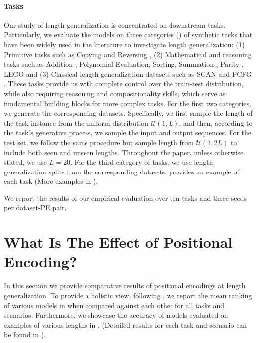 \documentclass{article}
\begin{document}
\paragraph{Tasks}
Our study of length generalization is concentrated on downstream tasks.
Particularly, we evaluate the models on three categories () of synthetic tasks that have been widely used in the literature to investigate length generalization:
(1) Primitive tasks such as Copying and Reversing
\citep{Ontanon2022:MakeTransformerCompositional},
(2) Mathematical and reasoning tasks such as Addition \citep{Nye2021:Scratchpad},
Polynomial Evaluation, Sorting, Summation \citep{Saxton2018:DeepmindMath}, Parity \citep{Anil2022:LengthFailure}, LEGO \citep{Zhang2023:LEGO}
and (3) Classical length generalization datasets such as SCAN \citep{Lake2018:SCAN} and PCFG \citep{Hupkes2020:Compositionality}.
These tasks provide us with complete control over the train-test distribution, while also requiring reasoning and compositionality skills, which serve as fundamental building blocks for more complex tasks.
For the first two categories, we generate the corresponding datasets.
Specifically, we first sample the length of the task instance from the uniform distribution
$\mathcal{U}(1, L)$, and then, according to the task's generative process, we sample the input and output sequences. For the test set, we follow the same procedure but sample length from $\mathcal{U}(1, 2L)$ to include both seen and unseen lengths.
Throughout the paper, unless otherwise stated, we use $L=20$.
For the third category of tasks, we use length generalization splits from the corresponding datasets.
 provides an example of each task (More examples in ).


We report the results of our empirical evaluation over ten tasks and three seeds per dataset-PE pair.

\section{What Is The Effect of Positional Encoding?}



\label{sec:results_len_extrapolation}
In this section we provide comparative results of positional encodings at length generalization.
To provide a holistic view, following \citet{Liang2022:HELM}, we report the mean ranking of various models in  when compared against each other for all tasks and scenarios.
Furthermore, we showcase the accuracy of models evaluated on examples of various lengths in .
(Detailed results for each task and scenario can be found in ).
\end{document}
